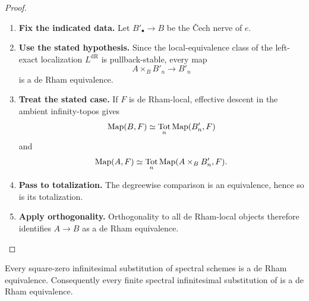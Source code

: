 \begin{proof}
\leavevmode
\begin{enumerate}[label=\textup{(\arabic*)}]
    \item \textbf{Fix the indicated data.}
    Let \(B'_\bullet\to B\) be the \v{C}ech nerve of \(e\).
    \item \textbf{Use the stated hypothesis.}
    Since the
    local-equivalence class of the left-exact localization \(L^{\mathrm{dR}}\) is
    pullback-stable, every map
    \[
    A\times_BB'_n\longrightarrow B'_n
    \]
    is a de Rham equivalence.
    \item \textbf{Treat the stated case.}
    If \(F\) is de Rham-local, effective descent in the
    ambient infinity-topos gives
    \[
    \operatorname{Map}(B,F)
    \simeq
    \operatorname*{Tot}_n\operatorname{Map}(B'_n,F)
    \]
    and
    \[
    \operatorname{Map}(A,F)
    \simeq
    \operatorname*{Tot}_n
    \operatorname{Map}(A\times_BB'_n,F).
    \]
    \item \textbf{Pass to totalization.}
    The degreewise comparison is an equivalence, hence so is its totalization.
    \item \textbf{Apply orthogonality.}
    Orthogonality to all de Rham-local objects therefore identifies \(A\to B\) as a
    de Rham equivalence.
\end{enumerate}
\end{proof}

\begin{proposition}
\label{prop:global-finite-infinitesimal-de-Rham}
Every square-zero infinitesimal substitution of spectral schemes is a
de Rham equivalence. Consequently every finite spectral infinitesimal
substitution of
is a de Rham equivalence.
\end{proposition}

